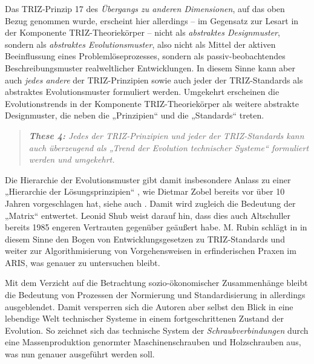 \documentclass[12pt,a4paper]{article}
\begin{document}
Das TRIZ-Prinzip 17 des \emph{Übergangs zu anderen Dimensionen}, auf das oben
Bezug genommen wurde, erscheint hier allerdings -- im Gegensatz zur Lesart in
der Komponente TRIZ-Theoriekörper -- nicht als \emph{abstraktes Designmuster},
sondern als \emph{abstraktes Evolutionsmuster}, also nicht als Mittel der
aktiven Beeinflussung eines Problemlöseprozesses, sondern als
passiv-beobachtendes Beschreibungsmuster realweltlicher Entwicklungen.  In
diesem Sinne kann aber auch \emph{jedes andere} der TRIZ-Prinzipien sowie auch
jeder der TRIZ-Standards als abstraktes Evolutionsmuster formuliert
werden. Umgekehrt erscheinen die Evolutionstrends in der Komponente
TRIZ-Theoriekörper als weitere abstrakte Designmuster, die neben die
„Prinzipien“ und die „Standards“ treten.
\begin{quote}\it
  \textbf{These 4:} Jedes der TRIZ-Prinzipien und jeder der TRIZ-Standards
  kann auch überzeugend als „Trend der Evolution technischer Systeme“
  formuliert werden und umgekehrt.
\end{quote}
Die Hierarchie der Evolutionsmuster gibt damit insbesondere Anlass zu einer
„Hierarchie der Lösungsprinzipien“ \cite[Kap. 3]{Zobel2016}, wie Dietmar Zobel
bereits vor über 10 Jahren vorgeschlagen hat, siehe auch \cite{Zobel2020}.
Damit wird zugleich die Bedeutung der „Matrix“ entwertet. Leonid Shub
\cite{Shub2006} weist darauf hin, dass dies auch Altschuller bereits 1985
engeren Vertrauten gegenüber geäußert habe.  M. Rubin schlägt in
\cite{Rubin2019} in diesem Sinne den Bogen von Entwicklungsgesetzen zu
TRIZ-Standards und weiter zur Algorithmisierung von Vorgehensweisen in
erfinderischen Praxen im ARIS, was genauer zu untersuchen bleibt.

Mit dem Verzicht auf die Betrachtung sozio-ökonomischer Zusammenhänge bleibt
die Bedeutung von Prozessen der Normierung und Standardisierung in
\cite{TESE2018} allerdings ausgeblendet. Damit versperren sich die Autoren
aber selbst den Blick in eine lebendige Welt technischer Systeme in einem
fortgeschrittenen Zustand der Evolution. So zeichnet sich das technische
System der \emph{Schraubverbindungen} durch eine Massenproduktion genormter
Maschinenschrauben und Holzschrauben aus, was nun genauer ausgeführt werden
soll.
\end{document}
